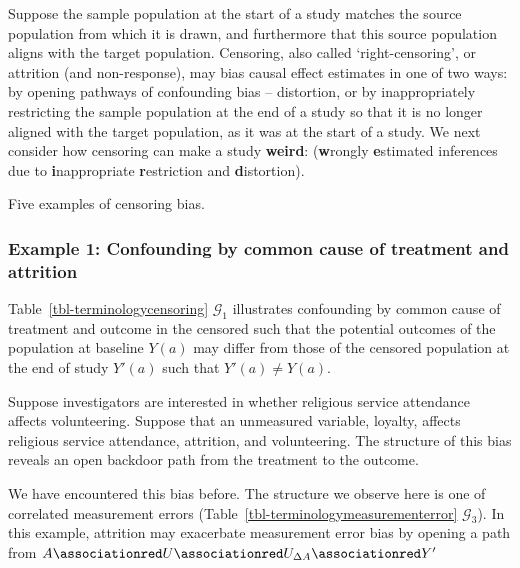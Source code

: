 \documentclass[
  single column]{article}
\begin{document}
Suppose the sample population at the start of a study matches the source
population from which it is drawn, and furthermore that this source
population aligns with the target population. Censoring, also called
`right-censoring', or attrition (and non-response), may bias causal
effect estimates in one of two ways: by opening pathways of confounding
bias -- distortion, or by inappropriately restricting the sample
population at the end of a study so that it is no longer aligned with
the target population, as it was at the start of a study. We next
consider how censoring can make a study \textbf{weird}:
(\textbf{w}rongly \textbf{e}stimated inferences due to
\textbf{i}nappropriate \textbf{r}estriction and \textbf{d}istortion).

\begin{table}

\caption{\label{tbl-terminologycensoring}Five examples of censoring
bias.}

\centering{

\terminologycensoring

}

\end{table}%

\subsubsection{Example 1: Confounding by common cause of treatment and
attrition}\label{example-1-confounding-by-common-cause-of-treatment-and-attrition}

Table~\ref{tbl-terminologycensoring} \(\mathcal{G}_1\) illustrates
confounding by common cause of treatment and outcome in the censored
such that the potential outcomes of the population at baseline \(Y(a)\)
may differ from those of the censored population at the end of study
\(Y'(a)\) such that \(Y'(a) \neq Y(a)\).

Suppose investigators are interested in whether religious service
attendance affects volunteering. Suppose that an unmeasured variable,
loyalty, affects religious service attendance, attrition, and
volunteering. The structure of this bias reveals an open backdoor path
from the treatment to the outcome.

We have encountered this bias before. The structure we observe here is
one of correlated measurement errors
(Table~\ref{tbl-terminologymeasurementerror} \(\mathcal{G}_3\)). In this
example, attrition may exacerbate measurement error bias by opening a
path from
\(A \associationred U \associationred U_{\Delta{A}}  \associationred Y'\)
\end{document}
